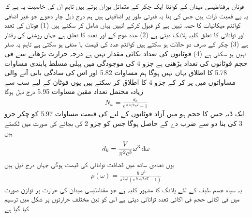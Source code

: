 
فوٹان برقناطیسی میدان کے کوانٹا ایک چکر کے متماثل بوزان ہوتے ہیں تاہم ان کی خاصیت یہ ہے کہ یہ بے قمیت ذرات ہیں جس کی بنا یہ قدرتی طور پر اضافیتی ہیں ہم درج ذیل چار دعوے جو غیر اضافی کوانٹم میکانیات کا حصہ نہیں ہے کو قبول کرکے انہیں یہاں شامل کر سکتے ہیں  (1) فوٹان کی تعدد اور توانائی کا تعلق کلیہ پلانک  دیتی ہے  (2) عدد موج کے اور تعدد کا تعلق  ہے جہاں  روشنی کی رفتار ہے  (3) چکر کے صرف دو حالات ہو سکتے ہیں کوانٹم عدد  کی قیمت  یا منفی  ہو سکتی ہے تاہم یہ صفر نہیں ہو سکتی ہے  (4) فوٹانوں کی تعداد بکائی مقدار نہیں ہے درجہ حرارت بڑھانے سے فی حجم فوٹانوں کی تعداد بڑھتی ہے  جزو 4 کی موجودگی میں پہلی مسلط پابندی مساوات 5.78 کا اطلاق یہاں نہیں ہوگا ہم مساوات 5.82 اور اس کی سادگی بانی آنے والی مساواتوں میں  پر کر کے جزو 4 کا اطلاق کر سکتے ہیں یوں فوٹان کے لیے سب سے زیادہ محتمل تعداد مقین مساوات 5.95 درج ذیل ہوگا 
\begin{align}
N_{\omega} = \frac{d_k}{e^{\hslash \omega / k_B T} - 1}
\end{align}
ایک ڈبہ جس کا حجم  ہو میں آزاد فوٹانوں کے لیے  کی قیمت مساوات 5.97 کو چکر جزو 3 کی بنا دو سے ضرب دے کے حاصل ہوگا جس کو  جزو 2 کی بجائے  کی صورت میں لکھتے ہیں 
\begin{align} 
d_k = \frac{V}{\pi^2 c^3} \omega^3 \dif  \omega
\end{align}
یوں تعددی ساتھ  میں قضافت توانائی  کی قیمت  ہوگی جہاں  درج ذیل ہیں 
\begin{align}
\rho (\omega) = \frac{\hslash \omega^3}{\pi^2 c^3 (e^{\hslash \omega / k_B T} - 1)}
\end{align}
یہ سیاہ جسم طیف کے لئے پلانک کا مشہور کلیہ ہے جو مقناطیسی میدان کی حرارت  پر توازن صورت میں فی اکائی حجم فی اکائی تعدد توانائی دیتی ہے اس کو تین مختلف حرارتوں پر شکل  میں ترسیم کیا گیا ہے 

